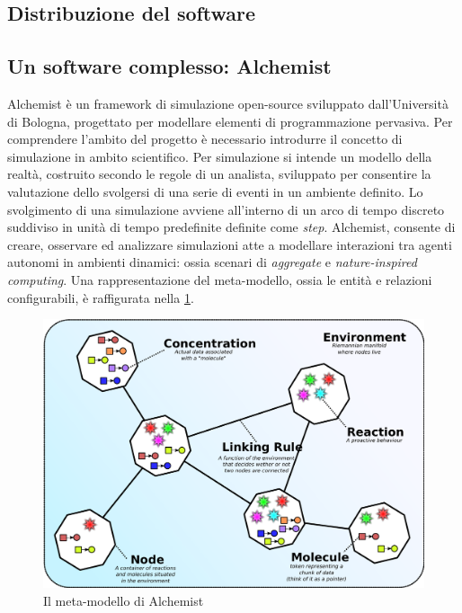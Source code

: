 \subsection{Distribuzione del software}

\subsection{Un software complesso: Alchemist}\label{sec:alchemist}
Alchemist\cite{Pianini_2013} è un framework di simulazione open-source sviluppato dall'Università di Bologna, progettato per modellare elementi di programmazione pervasiva. Per comprendere l'ambito del progetto è necessario introdurre il concetto di simulazione in ambito scientifico. Per simulazione si intende un modello della realtà, costruito secondo le regole di un analista, sviluppato per consentire la valutazione dello svolgersi di una serie di eventi in un ambiente definito. Lo svolgimento di una simulazione avviene all'interno di un arco di tempo discreto suddiviso in unità di tempo predefinite definite come \textit{step}. Alchemist, consente di creare, osservare ed analizzare simulazioni atte a modellare interazioni tra agenti autonomi in ambienti dinamici: ossia scenari di \textit{aggregate} e \textit{nature-inspired computing}. Una rappresentazione del meta-modello, ossia le entità e relazioni configurabili, è raffigurata nella \cref{fig:alchemist-metamodel}.

\begin{figure}[htb]
	\centering
	\includegraphics[width=.9\linewidth]{figures/alchemist-metamodel.pdf}
	\caption{Il meta-modello di Alchemist}
	\label{fig:alchemist-metamodel}
\end{figure}

